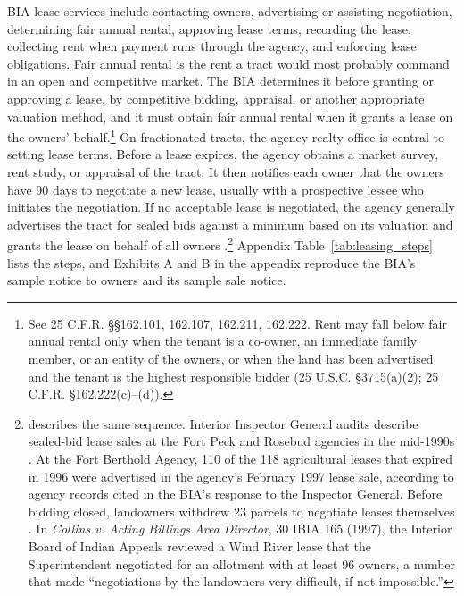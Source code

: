 \documentclass[12pt]{article}
\begin{document}
BIA lease services include contacting owners, advertising or assisting negotiation, determining fair annual rental, approving lease terms, recording the lease, collecting rent when payment runs through the agency, and enforcing lease obligations. Fair annual rental is the rent a tract would most probably command in an open and competitive market. The BIA determines it before granting or approving a lease, by competitive bidding, appraisal, or another appropriate valuation method, and it must obtain fair annual rental when it grants a lease on the owners' behalf.\footnote{See 25 C.F.R. \S\S 162.101, 162.107, 162.211, 162.222. Rent may fall below fair annual rental only when the tenant is a co-owner, an immediate family member, or an entity of the owners, or when the land has been advertised and the tenant is the highest responsible bidder (25 U.S.C. \S 3715(a)(2); 25 C.F.R. \S 162.222(c)--(d)).} On fractionated tracts, the agency realty office is central to setting lease terms. Before a lease expires, the agency obtains a market survey, rent study, or appraisal of the tract. It then notifies each owner that the owners have 90 days to negotiate a new lease, usually with a prospective lessee who initiates the negotiation. If no acceptable lease is negotiated, the agency generally advertises the tract for sealed bids against a minimum based on its valuation and grants the lease on behalf of all owners \citep[pp.~6--9, 15--17]{BIA2006Ch2}.\footnote{\citet[pp.~27--29]{GAO1999} describes the same sequence. Interior Inspector General audits describe sealed-bid lease sales at the Fort Peck and Rosebud agencies in the mid-1990s \citep{DOIOIG1998FortPeck, DOIOIG1998Rosebud}. At the Fort Berthold Agency, 110 of the 118 agricultural leases that expired in 1996 were advertised in the agency's February 1997 lease sale, according to agency records cited in the BIA's response to the Inspector General. Before bidding closed, landowners withdrew 23 parcels to negotiate leases themselves \citep{DOIOIG1998FortBerthold}. In \textit{Collins v. Acting Billings Area Director}, 30 IBIA 165 (1997), the Interior Board of Indian Appeals reviewed a Wind River lease that the Superintendent negotiated for an allotment with at least 96 owners, a number that made ``negotiations by the landowners very difficult, if not impossible.''} Appendix Table~\ref{tab:leasing_steps} lists the steps, and Exhibits A and B in the appendix reproduce the BIA's sample notice to owners and its sample sale notice.
\end{document}
